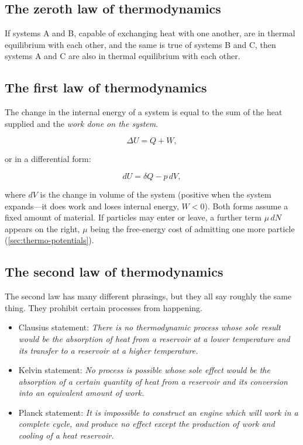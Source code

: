     \subsection{The zeroth law of thermodynamics}

        If systems A and B, capable of exchanging heat with one another, are in thermal equilibrium with each other, and the same is true of systems B and C, then systems A and C are also in thermal equilibrium with each other.

    \subsection{The first law of thermodynamics}

        The change in the internal energy of a system is equal to the sum of the heat supplied and the \emph{work done on the system}.

        \begin{equation}\label{eq:first-law}
            \Delta U = Q + W,
        \end{equation}

        or in a differential form:

        \begin{equation}\label{eq:first-law-differential}
            dU = \delta Q - p\, dV,
        \end{equation}

        where $dV$ is the change in volume of the system (positive when the system expands---it does work and loses internal energy, $W<0$). Both forms assume a fixed amount of material. If particles may enter or leave, a further term $\mu\,dN$ appears on the right, $\mu$ being the free-energy cost of admitting one more particle (\cref{sec:thermo-potentials}).
    \subsection{The second law of thermodynamics}

        The second law has many different phrasings, but they all say roughly the same thing. They prohibit certain processes from happening. 

        \begin{itemize}
            \item Clausius statement: \textit{There is no thermodynamic process whose sole result would be the absorption of heat from a reservoir at a lower temperature and its transfer to a reservoir at a higher temperature.}
            \item Kelvin statement: \textit{No process is possible whose sole effect would be the absorption of a certain quantity of heat from a reservoir and its conversion into an equivalent amount of work.}
            \item Planck statement: \textit{It is impossible to construct an engine which will work in a complete cycle, and produce no effect except the production of work and cooling of a heat reservoir.}
        \end{itemize}

